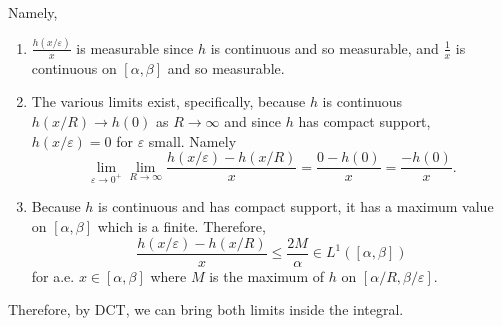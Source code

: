 \documentclass[12pt]{Qual}
\begin{document}
\begin{solution}
Namely, \begin{enumerate}
    \item $\frac{h(x/\varepsilon)}{x}$ is measurable since $h$ is continuous and so measurable, and $\frac{1}{x}$ is continuous on $[\alpha,\beta]$ and so measurable.
    \item The various limits exist, specifically, because $h$ is continuous $h(x/R)\to h(0)$ as $R\to\infty$ and since $h$ has compact support, $h(x/\varepsilon)=0$ for $\varepsilon$ small. Namely $$\lim_{\varepsilon\to0^+}\lim_{R\to\infty}\frac{h(x/\varepsilon)-h(x/R)}{x}=\frac{0-h(0)}{x}=\frac{-h(0)}{x}.$$
    \item Because $h$ is continuous and has compact support, it has a maximum value on $[\alpha,\beta]$ which is a finite. Therefore, $$\frac{h(x/\varepsilon)-h(x/R)}{x}\le\frac{2M}{\alpha}\in L^1([\alpha,\beta])$$ for a.e. $x\in[\alpha,\beta]$ where $M$ is the maximum of $h$ on $[\alpha/R,\beta/\varepsilon].$
\end{enumerate}

Therefore, by DCT, we can bring both limits inside the integral.
\end{solution}
\vspace{0.5cm}
\end{document}
